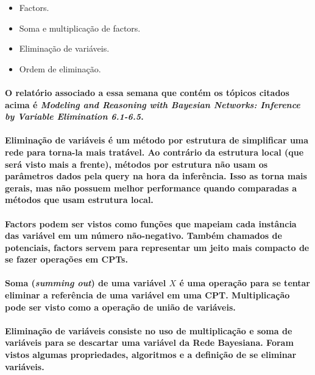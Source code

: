 \documentclass[a4paper,10pt]{article}
\theoremstyle{plain}
\begin{document}
\begin{itemize}
  \item Factors.
  \item Soma e multiplicação de factors.
  \item Eliminação de variáveis.
  \item Ordem de eliminação.
\end{itemize}

\paragraph{
  O relatório associado a essa semana que contém os tópicos citados acima é \textit{Modeling and
  Reasoning with Bayesian Networks: Inference by Variable Elimination 6.1-6.5}\cite{report-2}.
}

\paragraph{
  Eliminação de variáveis é um método por estrutura de simplificar uma rede para torna-la mais
  tratável. Ao contrário da estrutura local (que será visto mais a frente), métodos por estrutura
  não usam os parâmetros dados pela query na hora da inferência. Isso as torna mais gerais, mas
  não possuem melhor performance quando comparadas a métodos que usam estrutura local.
}

\paragraph{
  Factors podem ser vistos como funções que mapeiam cada instância das variável em um número
  não-negativo. Também chamados de potenciais, factors servem para representar um jeito mais
  compacto de se fazer operações em CPTs.
}

\paragraph{
  Soma (\textit{summing out}) de uma variável $X$ é uma operação para se tentar eliminar a
  referência de uma variável em uma CPT. Multiplicação pode ser visto como a operação de união de
  variáveis.
}

\paragraph{
  Eliminação de variáveis consiste no uso de multiplicação e soma de variáveis para se descartar
  uma variável da Rede Bayesiana. Foram vistos algumas propriedades, algoritmos e a definição de
  se eliminar variáveis.
}
\end{document}

